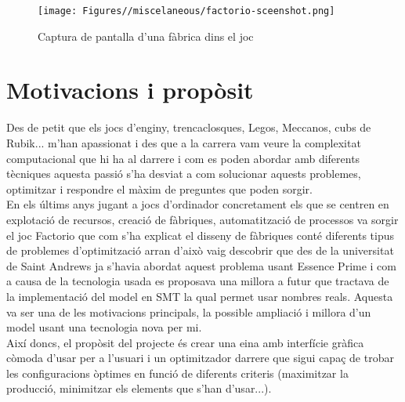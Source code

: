 \begin{figure}
    \centering
    \texttt{[image: Figures//miscelaneous/factorio-sceenshot.png]}
    \caption{Captura de pantalla d'una fàbrica dins el joc}
    \label{fig:game-sceenshot}
\end{figure}

\section{Motivacions i propòsit}
Des de petit que els jocs d'enginy, trencaclosques, Legos, Meccanos, cubs de Rubik... m'han apassionat i des que a la carrera vam veure la complexitat computacional que hi ha al darrere i com es poden abordar amb diferents tècniques aquesta passió s'ha desviat a com solucionar aquests problemes, optimitzar i respondre el màxim de preguntes que poden sorgir.\\

En els últims anys jugant a jocs d'ordinador concretament els que se centren en explotació de recursos, creació de fàbriques, automatització de processos va sorgir el joc Factorio que com s'ha explicat el disseny de fàbriques conté diferents tipus de problemes d'optimització arran d'això vaig descobrir que des de la universitat de Saint Andrews ja s'havia abordat aquest problema usant Essence Prime i com a causa de la tecnologia usada es proposava una millora a futur que tractava de la implementació del model en SMT la qual permet usar nombres reals. Aquesta va ser una de les motivacions principals, la possible ampliació i millora d'un model usant una tecnologia nova per mi.\\

Així doncs, el propòsit del projecte és crear una eina amb interfície gràfica còmoda d'usar per a l'usuari i un optimitzador darrere que sigui capaç de trobar les configuracions òptimes en funció de diferents criteris (maximitzar la producció, minimitzar els elements que s'han d'usar...).

